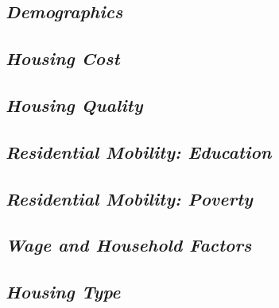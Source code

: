 \subsection{\textit{Demographics}}





\subsection{\textit{Housing Cost}}



\subsection{\textit{Housing Quality}}




\subsection{\textit{Residential Mobility: Education}}



\subsection{\textit{Residential Mobility: Poverty}}



\subsection{\textit{Wage and Household Factors}}



\subsection{\textit{Housing Type}}





\endinput